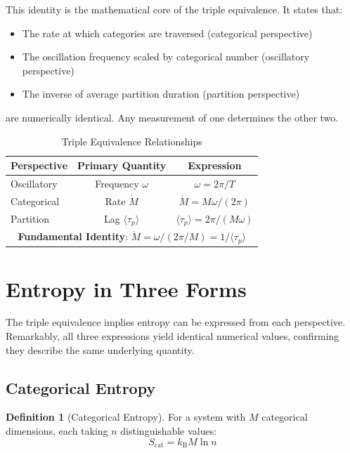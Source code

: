 \documentclass[twocolumn,10pt]{article}
\theoremstyle{definition}
\newtheorem{definition}[theorem]{Definition}
\theoremstyle{remark}
\newcommand{\kB}{k_{\mathrm{B}}}
\begin{document}
This identity is the mathematical core of the triple equivalence. It states that:
\begin{itemize}
\item The rate at which categories are traversed (categorical perspective)
\item The oscillation frequency scaled by categorical number (oscillatory perspective)
\item The inverse of average partition duration (partition perspective)
\end{itemize}
are numerically identical. Any measurement of one determines the other two.

\begin{table}[h]
\centering
\caption{Triple Equivalence Relationships}
\label{tab:triple_relations}
\begin{tabular}{lcc}
\toprule
\textbf{Perspective} & \textbf{Primary Quantity} & \textbf{Expression} \\
\midrule
Oscillatory & Frequency $\omega$ & $\omega = 2\pi/T$ \\
Categorical & Rate $\dot{M}$ & $\dot{M} = M\omega/(2\pi)$ \\
Partition & Lag $\langle\tau_p\rangle$ & $\langle\tau_p\rangle = 2\pi/(M\omega)$ \\
\midrule
\multicolumn{3}{c}{\textbf{Fundamental Identity}: $\dot{M} = \omega/(2\pi/M) = 1/\langle\tau_p\rangle$} \\
\bottomrule
\end{tabular}
\end{table}

\section{Entropy in Three Forms}
\label{sec:entropy}

The triple equivalence implies entropy can be expressed from each perspective. Remarkably, all three expressions yield identical numerical values, confirming they describe the same underlying quantity.

\subsection{Categorical Entropy}

\begin{definition}[Categorical Entropy]
\label{def:cat_entropy}
For a system with $M$ categorical dimensions, each taking $n$ distinguishable values:
\begin{equation}
S_{\text{cat}} = \kB M \ln n
\label{eq:categorical_entropy}
\end{equation}
\end{definition}
\end{document}
